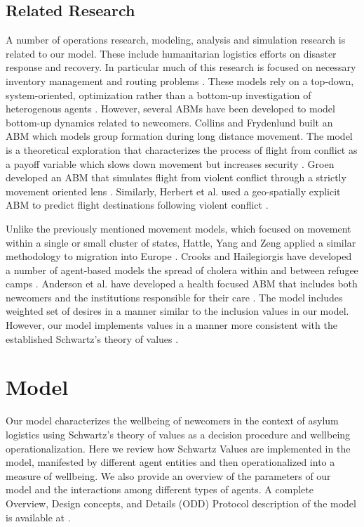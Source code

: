 \documentclass{scspaperproc}
\theoremstyle{scsthe}
\begin{document}
\subsection{Related Research}
A number of operations research, modeling, analysis and simulation research is related to our model. These include humanitarian logistics efforts on disaster response and recovery. In particular much of this research is focused on necessary inventory management and routing problems \cite{67}. These models rely on a top-down, system-oriented, optimization rather than a bottom-up investigation of heterogenous agents \cite{13,30,31,34}. However, several ABMs have been developed to model bottom-up dynamics related to newcomers. Collins and Frydenlund built an ABM which models group formation during long distance movement. The model is a theoretical exploration that characterizes the process of flight from conflict as a payoff variable which slows down movement but increases security \cite{22}. Groen developed an ABM that simulates flight from violent conflict through a strictly movement oriented lens \cite{37}. Similarly, Herbert et al. used a geo-spatially explicit ABM to predict flight destinations following violent conflict \cite{43}. 

Unlike the previously mentioned movement models, which focused on movement within a single or small cluster of states, Hattle, Yang and Zeng applied a similar methodology to migration into Europe \cite{42}. Crooks and Hailegiorgis have developed a number of agent-based models the spread of cholera within and between refugee camps \cite{27,28,38}. Anderson et al. have developed a health focused ABM that includes both newcomers and the institutions responsible for their care \cite{3,4}. The model includes weighted set of desires in a manner similar to the inclusion values in our model. However, our model implements values in a manner more consistent with the established Schwartz's theory of values \cite{phil.masters.thesis}.

\section{Model}

Our model characterizes the wellbeing of newcomers in the context of asylum logistics using Schwartz's theory of values as a decision procedure and wellbeing operationalization. Here we review how Schwartz Values are implemented in the model, manifested by different agent entities and then operationalized into a measure of wellbeing. We also provide an overview of the parameters of our model and the interactions among different types of agents. A complete Overview, Design concepts, and Details (ODD) Protocol description of the model is available at \cite{phil.masters.thesis}.
\end{document}

